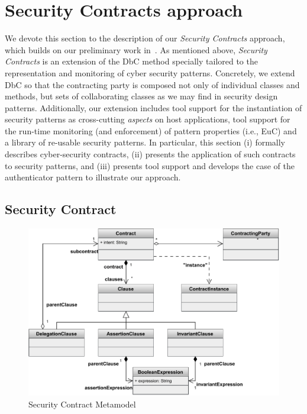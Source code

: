 \section{Security Contracts approach}
\label{sec:security-contracts-approach}

We devote this section to the description of our \emph{Security Contracts} approach, which builds on our preliminary work in~\cite{guerin:hal-03217126}. As mentioned above, \emph{Security Contracts} is an extension of the DbC method specially tailored to the representation and monitoring of cyber security patterns. Concretely, we extend DbC so that the contracting party is composed not only of individual classes and methods, but sets of collaborating classes as we may find in security design patterns. Additionally, our extension includes tool support for the instantiation of security patterns as cross-cutting \emph{aspects} on host applications, tool support for the run-time monitoring (and enforcement) of pattern properties (i.e., EuC) and a library of re-usable security patterns. In particular, this section (i) formally describes cyber-security contracts, (ii) presents the application of such contracts to security patterns, and (iii) presents tool support and develops the case of the authenticator pattern to illustrate our approach.

\subsection{Security Contract}



\begin{figure}
    \centering
    \includegraphics[width=1.0\columnwidth]{figures/MetamodelSecurityContractV3.pdf}
    \caption{Security Contract Metamodel}
    \label{fig:securitycontractmetamodel}
 \end{figure}


